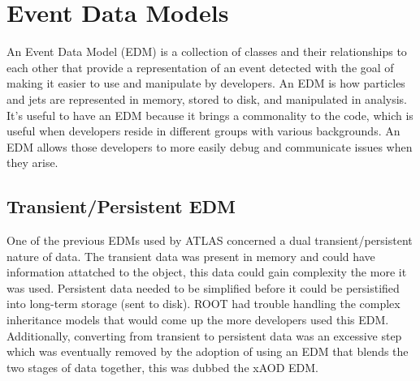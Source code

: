 \section{Event Data Models}
An Event Data Model (EDM) is a collection of classes and their relationships to each other that provide a representation of an event detected with the goal of making it easier to use and manipulate by developers.
An EDM is how particles and jets are represented in memory, stored to disk, and manipulated in analysis.
It's useful to have an EDM because it brings a commonality to the code, which is useful when developers reside in different groups with various backgrounds.
An EDM allows those developers to more easily debug and communicate issues when they arise.  

\subsection{Transient/Persistent EDM}
One of the previous EDMs used by ATLAS concerned a dual transient/persistent nature of data.
The transient data was present in memory and could have information attatched to the object, this data could gain complexity the more it was used.
Persistent data needed to be simplified before it could be persistified into long-term storage (sent to disk). 
ROOT had trouble handling the complex inheritance models that would come up the more developers used this EDM. 
Additionally, converting from transient to persistent data was an excessive step which was eventually removed by the adoption of using an EDM that blends the two stages of data together, this was dubbed the xAOD EDM.

